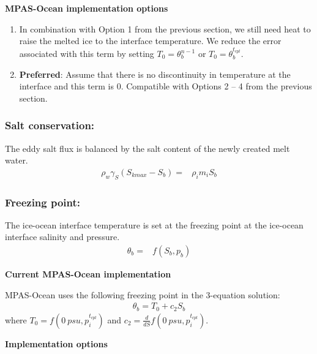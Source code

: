 \documentclass[11pt]{report}
\newcommand{\bea}{\begin{eqnarray}}
\newcommand{\eea}{\end{eqnarray}}
\begin{document}
\textbf{MPAS-Ocean implementation options}

\begin{enumerate}
    \item In combination with Option 1 from the previous section, we still need heat to raise the melted ice to the interface temperature. We reduce the error associated with this term by setting $T_0 = \theta_b^{n-1}$ or $T_0 = \theta_b^{t_{cpl}}$.
    \item \textbf{Preferred}: Assume that there is no discontinuity in temperature at the interface and this term is 0. Compatible with Options 2 -- 4 from the previous section.
\end{enumerate}

\subsubsection{Salt conservation:}

The eddy salt flux is balanced by the salt content of the newly created melt water.
\bea
    \rho_w \gamma_S(S_{kmax} - S_b) =& \rho_i m_i S_b \label{eq:3eqn-salt}
\eea

\subsubsection{Freezing point:}
The ice-ocean interface temperature is set at the freezing point at the ice-ocean interface salinity and pressure.
\bea
    \theta_b =& f(S_b, p_b)\label{eq:freezing}
\eea


\textbf{Current MPAS-Ocean implementation}

MPAS-Ocean uses the following freezing point in the 3-equation solution:
\bea
    \theta_b = T_0 + c_2 S_b
\eea
where $T_0 = f(0\:psu, p_i^{t_{cpl}})$ and $c_2 = \frac{d}{dS} f(0\:psu, p_i^{t_{cpl}})$.

\textbf{Implementation options}
\end{document}
